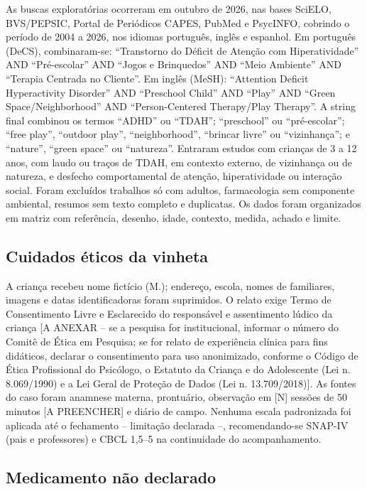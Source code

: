 As buscas explorat\'orias ocorreram em outubro de 2026, nas bases SciELO, BVS/PEPSIC, Portal de Peri\'odicos CAPES, PubMed e PsycINFO, cobrindo o per\'iodo de 2004 a 2026, nos idiomas portugu\^es, ingl\^es e espanhol. Em portugu\^es (DeCS), combinaram-se: ``Transtorno do D\'eficit de Aten\c{c}\~ao com Hiperatividade'' AND ``Pr\'e-escolar'' AND ``Jogos e Brinquedos'' AND ``Meio Ambiente'' AND ``Terapia Centrada no Cliente''. Em ingl\^es (MeSH): ``Attention Deficit Hyperactivity Disorder'' AND ``Preschool Child'' AND ``Play'' AND ``Green Space/Neighborhood'' AND ``Person-Centered Therapy/Play Therapy''. A string final combinou os termos ``ADHD'' ou ``TDAH''; ``preschool'' ou ``pr\'e-escolar''; ``free play'', ``outdoor play'', ``neighborhood'', ``brincar livre'' ou ``vizinhan\c{c}a''; e ``nature'', ``green space'' ou ``natureza''. Entraram estudos com crian\c{c}as de 3 a 12 anos, com laudo ou tra\c{c}os de TDAH, em contexto externo, de vizinhan\c{c}a ou de natureza, e desfecho comportamental de aten\c{c}\~ao, hiperatividade ou intera\c{c}\~ao social. Foram exclu\'idos trabalhos s\'o com adultos, farmacologia sem componente ambiental, resumos sem texto completo e duplicatas. Os dados foram organizados em matriz com refer\^encia, desenho, idade, contexto, medida, achado e limite.

\subsection{Cuidados \'eticos da vinheta}

A crian\c{c}a recebeu nome fict\'icio (M.); endere\c{c}o, escola, nomes de familiares, imagens e datas identificadoras foram suprimidos. O relato exige Termo de Consentimento Livre e Esclarecido do respons\'avel e assentimento l\'udico da crian\c{c}a [A ANEXAR -- se a pesquisa for institucional, informar o n\'umero do Comit\^e de \'Etica em Pesquisa; se for relato de experi\^encia cl\'inica para fins did\'aticos, declarar o consentimento para uso anonimizado, conforme o C\'odigo de \'Etica Profissional do Psic\'ologo, o Estatuto da Crian\c{c}a e do Adolescente (Lei n. 8.069/1990) e a Lei Geral de Prote\c{c}\~ao de Dados (Lei n. 13.709/2018)]. As fontes do caso foram anamnese materna, prontu\'ario, observa\c{c}\~ao em [N] sess\~oes de 50 minutos [A PREENCHER] e di\'ario de campo. Nenhuma escala padronizada foi aplicada at\'e o fechamento -- limita\c{c}\~ao declarada --, recomendando-se SNAP-IV (pais e professores) e CBCL 1,5--5 na continuidade do acompanhamento.

\subsection{Medicamento n\~ao declarado}

